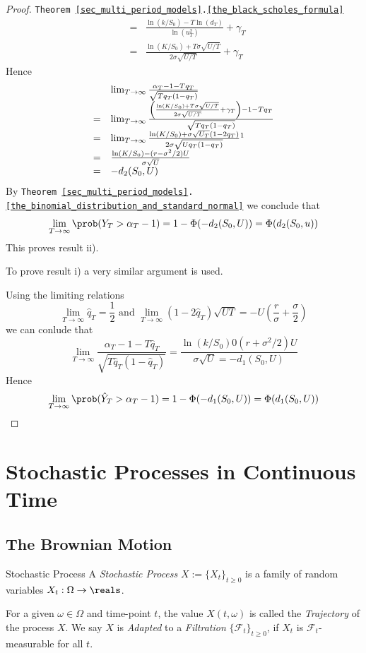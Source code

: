 \documentclass[11pt,a4paper]{article}
\begin{document}
\begin{proof}{\texttt{Theorem  \ref{sec_multi_period_models}.\ref{the_black_scholes_formula}}}
\[\begin{array}{rcl}
      &=&\frac{\ln(k/S_0)-T\ln(d_T)}{\ln(u_T^2)}+\gamma_T\\
      &=&\frac{\ln(K/S_0)+T\sigma\sqrt{U/T}}{2\sigma\sqrt{U/T}}+\gamma_T
    \end{array}\]
    Hence
    \[\begin{array}{rl}
      &\lim_{T\to\infty}\frac{\alpha_T-1-Tq_T}{\sqrt{Tq_T(1-q_T)}}\\
      =&\lim_{T\to\infty}\frac{\left(\frac{\ln(K/S_0)+T\sigma\sqrt{U/T}}{2\sigma\sqrt{U/T}}+\gamma_T\right)-1-Tq_T}{\sqrt{Tq_T(1-q_T)}}\\
      =&\lim_{T\to\infty}\frac{\ln(K/S_0)+\sigma\sqrt{U_T}(1-2q_T)}{2\sigma\sqrt{Uq_T(1-q_T)}}\footnotemark\\
      =&\frac{\ln(K/S_0)-(r-\sigma^2/2)U}{\sigma\sqrt{U}}\\
      =&-d_2(S_0,U)
    \end{array}\]
    By \texttt{Theorem \ref{sec_multi_period_models}.\ref{the_binomial_distribution_and_standard_normal}} we conclude that
    \[ \lim_{T\to\infty}\prob(Y_T>\alpha_T-1)=1-\Phi(-d_2(S_0,U))=\Phi(d_2(S_0,u)) \]
    This proves result ii).
    \par To prove result i) a very similar argument is used.
    \par Using the limiting relations
    \[ \lim_{T\to\infty}\hat{q}_T=\frac12\text{ and }\lim_{T\to\infty}(1-2\hat{q}_T)\sqrt{UT}=-U\left(\frac{r}\sigma+\frac\sigma2\right) \]
    we can conlude that
    \[ \lim_{T\to\infty}\frac{\alpha_T-1-T\hat{q}_T}{\sqrt{T\hat{q}_T(1-\hat{q}_T)}}=\frac{\ln(k/S_0)0(r+\sigma^2/2)U}{\sigma\sqrt{U}=-d_1(S_0,U)} \]
    Hence
    \[ \lim_{T\to\infty}\prob(\hat{Y}_T>\alpha_T-1)=1-\Phi(-d_1(S_0,U))=\Phi(d_1(S_0,U)) \]
    \proved
  \end{proof}

\section{Stochastic Processes in Continuous Time} \label{sec_stochastic_processes_in_continuous_time}

\subsection{The Brownian Motion}

  \begin{definition}{Stochastic Process}
    A \textit{Stochastic Process} $X:=\{X_t\}_{t\geq0}$ is a family of random variables $X_t:\Omega\to\reals$.
    \par For a given $\omega\in\Omega$ and time-point $t$, the value $X(t,\omega)$ is called the \textit{Trajectory} of the process $X$. We say $X$ is \textit{Adapted} to a \textit{Filtration} $\{\mathcal{F}_t\}_{t\geq0}$, if $X_t$ is $\mathcal{F}_t$-measurable for all $t$.
  \end{definition}
\end{document}

